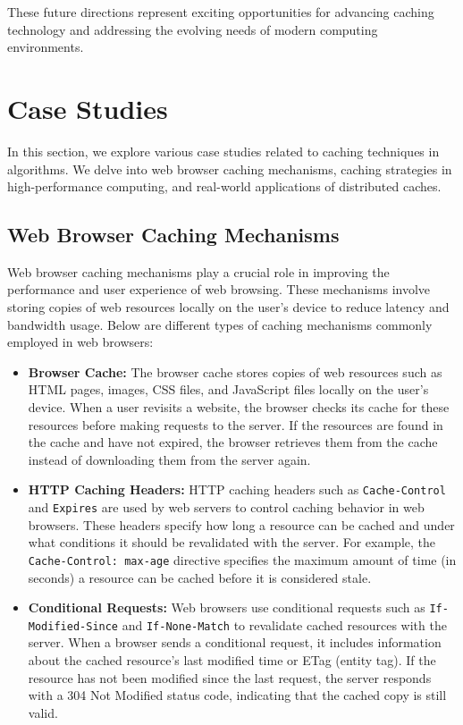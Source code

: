 \documentclass[12pt]{book} %
\begin{document}
These future directions represent exciting opportunities for advancing caching technology and addressing the evolving needs of modern computing environments.


\section{Case Studies}
In this section, we explore various case studies related to caching techniques in algorithms. We delve into web browser caching mechanisms, caching strategies in high-performance computing, and real-world applications of distributed caches.

\subsection{Web Browser Caching Mechanisms}
Web browser caching mechanisms play a crucial role in improving the performance and user experience of web browsing. These mechanisms involve storing copies of web resources locally on the user's device to reduce latency and bandwidth usage. Below are different types of caching mechanisms commonly employed in web browsers:

\begin{itemize}
    \item \textbf{Browser Cache:} The browser cache stores copies of web resources such as HTML pages, images, CSS files, and JavaScript files locally on the user's device. When a user revisits a website, the browser checks its cache for these resources before making requests to the server. If the resources are found in the cache and have not expired, the browser retrieves them from the cache instead of downloading them from the server again.
    
    \item \textbf{HTTP Caching Headers:} HTTP caching headers such as \texttt{Cache-Control} and \texttt{Expires} are used by web servers to control caching behavior in web browsers. These headers specify how long a resource can be cached and under what conditions it should be revalidated with the server. For example, the \texttt{Cache-Control: max-age} directive specifies the maximum amount of time (in seconds) a resource can be cached before it is considered stale.
    
    \item \textbf{Conditional Requests:} Web browsers use conditional requests such as \texttt{If-Modified-Since} and \texttt{If-None-Match} to revalidate cached resources with the server. When a browser sends a conditional request, it includes information about the cached resource's last modified time or ETag (entity tag). If the resource has not been modified since the last request, the server responds with a 304 Not Modified status code, indicating that the cached copy is still valid.
\end{itemize}
\end{document}
